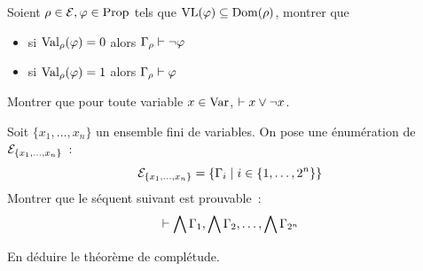 \begin{problem}
  \begin{pbQuest}
  \item Soient $\rho \in \mathcal E, \varphi \in \operatorname{Prop}$ tels que
    $\operatorname{VL}(\varphi)\subseteq \operatorname{Dom}(\rho)$, montrer que
    \begin{itemize}
    \item si $\operatorname{Val}_{\rho}(\varphi) = 0$ alors $\Gamma_{\rho} \vdash \lnot \varphi$
    \item si $\operatorname{Val}_{\rho}(\varphi) = 1$ alors $\Gamma_{\rho} \vdash \varphi$
    \end{itemize}
  \item Montrer que pour toute variable $x \in \operatorname{Var}$, $\vdash x \lor \lnot x$.
  \item Soit $\{x_1,\ldots,x_n\}$ un ensemble fini de variables. On pose une
    énumération de $\mathcal E_{\{x_1,\ldots,x_n\}}$~:
    \[\mathcal E_{\{x_1,\ldots,x_n\}} = \left\{ \Gamma_i \;\middle\vert\; i \in \{1,\ldots,2^n\} \right\}\]
    Montrer que le séquent suivant est prouvable~:
    \[\vdash \bigwedge \Gamma_1, \bigwedge\Gamma_2,\ldots,\bigwedge\Gamma_{2^n}\]
  \item En déduire le théorème de complétude.
  \end{pbQuest}
\end{problem}
